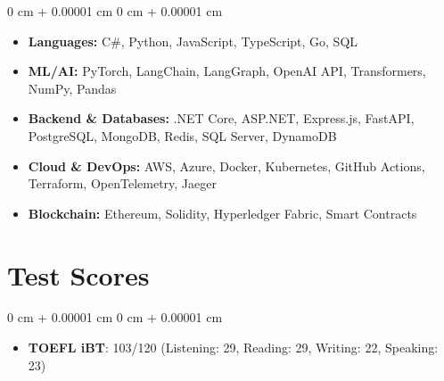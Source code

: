 \documentclass[10pt, letterpaper]{article}
\newenvironment{highlights}{
    \begin{itemize}[
        topsep=0.10 cm,
        parsep=0.10 cm,
        partopsep=0pt,
        itemsep=0pt,
        leftmargin=0 cm + 10pt
    ]
}{
    \end{itemize}
} %
\newenvironment{onecolentry}{
    \begin{adjustwidth}{
        0 cm + 0.00001 cm
    }{
        0 cm + 0.00001 cm
    }
}{
    \end{adjustwidth}
} %
\begin{document}
\begin{onecolentry}
    \begin{highlights}
        \item \textbf{Languages:} C\#, Python, JavaScript, TypeScript, Go, SQL
        \item \textbf{ML/AI:} PyTorch, LangChain, LangGraph, OpenAI API, Transformers, NumPy, Pandas
        \item \textbf{Backend \& Databases:} .NET Core, ASP.NET, Express.js, FastAPI, PostgreSQL, MongoDB, Redis, SQL Server, DynamoDB
        \item \textbf{Cloud \& DevOps:} AWS, Azure, Docker, Kubernetes, GitHub Actions, Terraform, OpenTelemetry, Jaeger
        \item \textbf{Blockchain:} Ethereum, Solidity, Hyperledger Fabric, Smart Contracts
    \end{highlights}
\end{onecolentry}

\section{Test Scores}

\begin{onecolentry}
    \begin{highlights}
        \item \textbf{TOEFL iBT}: 103/120 (Listening: 29, Reading: 29, Writing: 22, Speaking: 23)
    \end{highlights}
\end{onecolentry}
\end{document}

